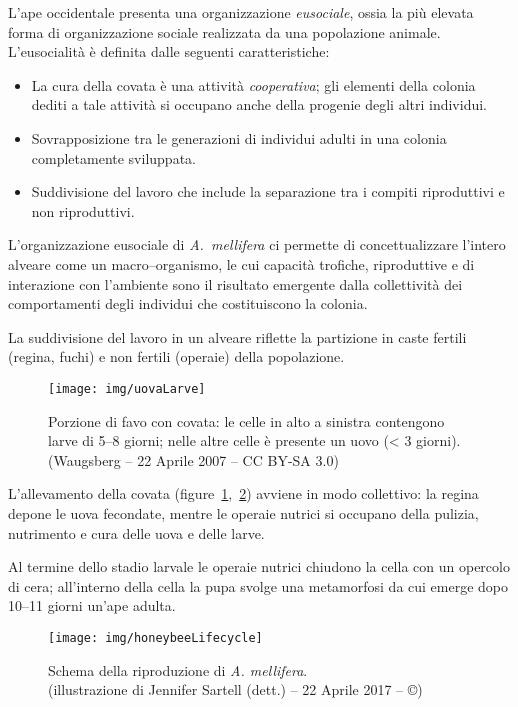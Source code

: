 L'ape occidentale presenta una organizzazione \emph{eusociale}, ossia la più elevata forma di organizzazione sociale realizzata da una popolazione animale. L'eusocialità è definita dalle seguenti caratteristiche:
\begin{itemize}
    \item La cura della covata è una attività \emph{cooperativa}; gli elementi della colonia dediti a tale attività si occupano anche della progenie degli altri individui.
    \item Sovrapposizione tra le generazioni di individui adulti in una colonia completamente sviluppata.
    \item Suddivisione del lavoro che include la separazione tra i compiti riproduttivi e non riproduttivi.
\end{itemize}

L'organizzazione eusociale di \emph{A.~mellifera} ci permette di concettualizzare l'intero alveare come un macro--organismo, le cui capacità trofiche, riproduttive e di interazione con l'ambiente sono il risultato emergente dalla collettività dei comportamenti degli individui che costituiscono la colonia.

La suddivisione del lavoro in un alveare riflette la partizione in caste fertili (regina, fuchi) e non fertili (operaie) della popolazione.

\begin{figure}
    \centering
    \texttt{[image: img/uovaLarve]}

    \caption[Covata giovane.]{Porzione di favo con covata: le celle in alto a sinistra contengono larve di 5--8 giorni; nelle altre celle è presente un uovo (< 3 giorni). \\ (Waugsberg -- 22 Aprile 2007 -- CC BY-SA 3.0)}
    \label{img:uovaLarve}
\end{figure}

L'allevamento della covata (figure~\ref{img:uovaLarve},~\ref{img:lifecycle}) avviene in modo collettivo: la regina depone le uova fecondate, mentre le operaie nutrici si occupano della pulizia, nutrimento e cura delle uova e delle larve.

Al termine dello stadio larvale le operaie nutrici chiudono la cella con un opercolo di cera; all'interno della cella la pupa svolge una metamorfosi da cui emerge dopo 10--11 giorni un'ape adulta.

\begin{figure}
    \centering
    \texttt{[image: img/honeybeeLifecycle]}

    \caption[Ciclo vitale dell'ape.]{Schema della riproduzione di \emph{A. mellifera}.
        \\ (illustrazione di Jennifer Sartell (dett.) -- 22 Aprile 2017 -- ©)}
    \label{img:lifecycle}
\end{figure}

